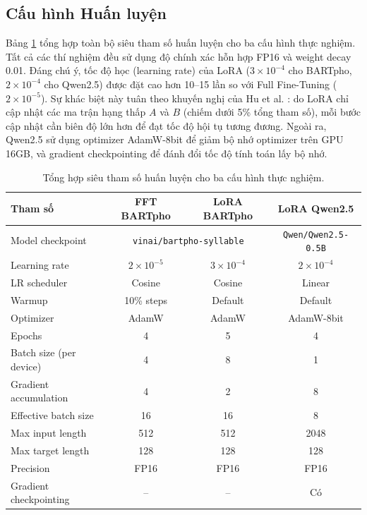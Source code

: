 \documentclass{article}
\begin{document}
\subsection{Cấu hình Huấn luyện}
Bảng \ref{tab:training_config} tổng hợp toàn bộ siêu tham số huấn luyện cho ba cấu hình thực nghiệm. Tất cả các thí nghiệm đều sử dụng độ chính xác hỗn hợp FP16 và weight decay 0.01. Đáng chú ý, tốc độ học (learning rate) của LoRA ($3 \times 10^{-4}$ cho BARTpho, $2 \times 10^{-4}$ cho Qwen2.5) được đặt cao hơn 10--15 lần so với Full Fine-Tuning ($2 \times 10^{-5}$). Sự khác biệt này tuân theo khuyến nghị của Hu et al. \cite{lora}: do LoRA chỉ cập nhật các ma trận hạng thấp $A$ và $B$ (chiếm dưới 5\% tổng tham số), mỗi bước cập nhật cần biên độ lớn hơn để đạt tốc độ hội tụ tương đương. Ngoài ra, Qwen2.5 sử dụng optimizer AdamW-8bit \cite{qlora} để giảm bộ nhớ optimizer trên GPU 16GB, và gradient checkpointing để đánh đổi tốc độ tính toán lấy bộ nhớ.

\begin{table}[H]
\centering
\caption{Tổng hợp siêu tham số huấn luyện cho ba cấu hình thực nghiệm.}
\label{tab:training_config}
\begin{tabular}{@{}lccc@{}}
\toprule
\textbf{Tham số} & \textbf{FFT BARTpho} & \textbf{LoRA BARTpho} & \textbf{LoRA Qwen2.5} \\
\midrule
Model checkpoint       & \multicolumn{2}{c}{\texttt{vinai/bartpho-syllable}} & \texttt{Qwen/Qwen2.5-0.5B} \\
Learning rate          & $2 \times 10^{-5}$ & $3 \times 10^{-4}$ & $2 \times 10^{-4}$ \\
LR scheduler           & Cosine & Cosine & Linear \\
Warmup                  & 10\% steps & Default & Default \\
Optimizer               & AdamW & AdamW & AdamW-8bit \\
Epochs                  & 4 & 5 & 4 \\
Batch size (per device) & 4 & 8 & 1 \\
Gradient accumulation   & 4 & 2 & 8 \\
Effective batch size    & 16 & 16 & 8 \\
Max input length        & 512 & 512 & 2048 \\
Max target length       & 128 & 128 & 128 \\
Precision               & FP16 & FP16 & FP16 \\
Gradient checkpointing  & -- & -- & Có \\
\bottomrule
\end{tabular}
\end{table}
\end{document}
